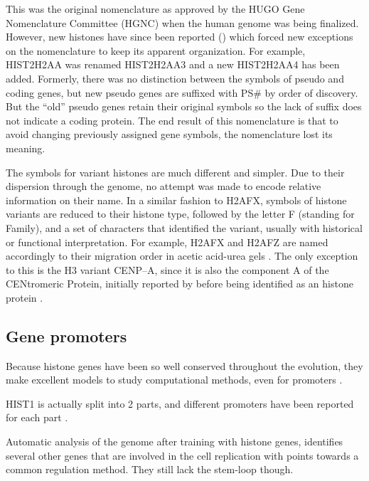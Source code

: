     This was the original nomenclature as approved by the HUGO Gene Nomenclature Committee (HGNC)
    when the human genome was being finalized. However, new histones have since been
    reported () which forced new exceptions on the
    nomenclature to keep its apparent organization. For example, HIST2H2AA was renamed
    HIST2H2AA3 and a new HIST2H2AA4 has been added. Formerly, there was no distinction
    between the symbols of pseudo and coding genes, but new pseudo genes are suffixed with
    PS\# by order of discovery. But the ``old'' pseudo genes retain their original symbols
    so the lack of suffix does not indicate a coding protein.
    The end result of this nomenclature is that to avoid changing previously
    assigned gene symbols, the nomenclature lost its meaning. 

    The symbols for variant histones are much different and simpler. Due to their dispersion
    through the genome, no attempt was made to encode relative information on their name. In
    a similar fashion to H2AFX, symbols of histone variants are reduced to their histone type,
    followed by the letter F (standing for Family), and a set of characters that identified
    the variant, usually with historical or functional interpretation. For example, H2AFX and
    H2AFZ are named accordingly to their migration order in acetic acid-urea gels
    \citep{HTwoA-first-variants}.
    The only exception to this is the H3 variant CENP--A, since it is also the component A
    of the CENtromeric Protein, initially reported by \cite{CENPA-first-report} before being
    identified as an histone protein \citep{CENPA-copurifies-histones, CENPA-sequence-analysis}.

  \subsection{Gene promoters}

    Because histone genes have been so well conserved throughout the evolution, they make
    excellent models to study computational methods, even for promoters
    \citep{histone-promoter-modeling}.

    HIST1 is actually split into 2 parts, and different promoters have been reported for each
    part \citep{HISTOne-different-transcripts}.

    Automatic analysis of the genome after training with histone genes, identifies
    several other genes that are involved in the cell replication with points
    towards a common regulation method. They still lack the stem-loop though.

